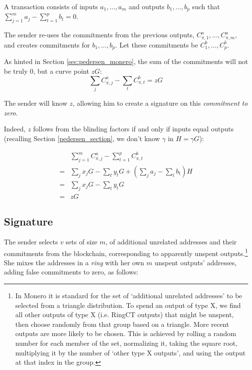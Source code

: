 A transaction consists of inputs \(a_1, ..., a_m\) and outputs \(b_1, ..., b_p\) such that \(\sum\limits_{j=1}^m a_j - \sum\limits_{t=1}^p b_t = 0\). 
 
The sender re-uses the commitments from the previous outputs, $C_{\pi,1}^a, ..., C_{\pi,m}^a,$ and creates commitments for $b_1, ..., b_p$. Let these commitments be $C_1^b, ..., C_p^b$.

As hinted in Section \ref{sec:pedersen_monero}, the sum of the commitments will not be truly 0, but a curve point $z G$:\\
\[\sum\limits_j C^a_{\pi, j} -\sum\limits_t C^b_{\pi, t} = z G  \]

The sender will know $z$, allowing him to create a signature on this {\em commitment to zero}. 

Indeed, $z$ follows from the blinding factors if and only if inputs equal outputs (recalling Section \ref{pedersen_section}, we don’t know $\gamma$ in $H = \gamma G$):


\begin{align*}
& \sum\limits_{j=1}^m C^a_{\pi, j} - \sum\limits_{t=1}^p C^b_{\pi, t} \\
= & \sum\limits_j x_j G - \sum\limits_t y_t G + (\sum\limits_j  a_j - \sum\limits_t  b_t) H\\
= & \sum\limits_j x_j G - \sum\limits_t y_t G \\
= & z G
\end{align*}




\subsection{Signature}
\label{full-signature}



The sender selects $v$ sets of size $m$, of additional unrelated addresses and their commitments from the blockchain, corresponding to apparently unspent outputs.\footnote{\label{input-selection}In Monero it is standard for the set of `additional unrelated addresses' to be selected from a triangle distribution. To spend an output of type X, we find all other outputs of type X (i.e. RingCT outputs) that might be unspent, then choose randomly from that group based on a triangle. More recent outputs are more likely to be chosen. This is achieved by rolling a random number for each member of the set, normalizing it, taking the square root, multiplying it by the number of `other type X outputs', and using the output at that index in the group.} She mixes the addresses in a {\em ring} with her own $m$ unspent outputs' addresses, adding false commitments to zero, as follows:

